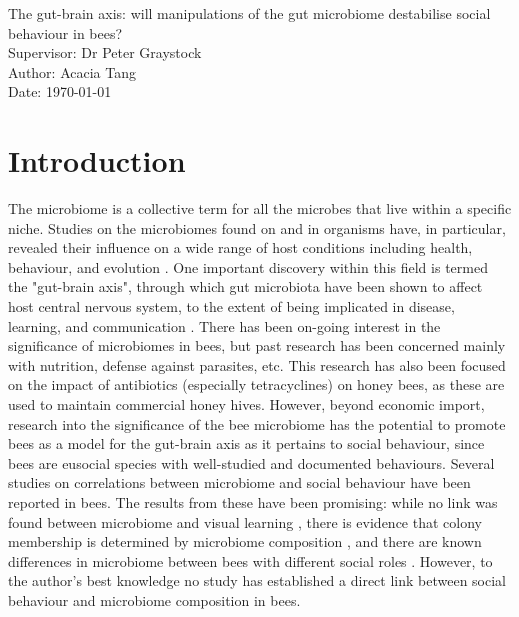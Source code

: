 \documentclass[11pt]{article}
\begin{document}
    \begin{titlepage}\centering
    \vspace*{\fill}
    \LARGE The gut-brain axis: will manipulations of the gut microbiome destabilise social behaviour in bees?\\
    \vspace{\baselineskip}
    \LARGE Supervisor: Dr Peter Graystock\\
    \vspace{\baselineskip}
    \normalsize Author: Acacia Tang\\
    \normalsize Date: {\today}
    \vspace*{\fill}
    \end{titlepage}

    \newpage
    \section{Introduction}
        The microbiome is a collective term for all the microbes that live within a specific niche.
        Studies on the microbiomes found on and in organisms have,
        in particular,
        revealed their influence on a wide range of host conditions including health, behaviour, and evolution
        \cite{archie2015social}.
        One important discovery within this field is termed the "gut-brain axis",
        through which gut microbiota have been shown to affect host central nervous system,
        to the extent of being implicated in disease, learning, and communication
        \cite{archie2015social}.
        There has been on-going interest in the significance of microbiomes in bees,
        but past research has been concerned mainly with nutrition, defense against parasites, etc.
        This research has also been focused on the impact of antibiotics (especially tetracyclines) on honey bees,
        as these are used to maintain commercial honey hives.
        However, beyond economic import,
        research into the significance of the bee microbiome has the potential to promote bees as a model for the gut-brain axis as it pertains to social behaviour,
        since bees are eusocial species with well-studied and documented behaviours.
        Several studies on correlations between microbiome and social behaviour have been reported in bees.
        The results from these have been promising: while no link was found between microbiome and visual learning
        \cite{leger2020gut},
        there is evidence that colony membership is determined by microbiome composition
        \cite{vernier2020gut},
        and there are known differences in microbiome between bees with different social roles
        \cite{jones2018gut}.
        However, to the author's best knowledge no study has established a direct link between social behaviour and microbiome composition in bees.
      
\end{document}
